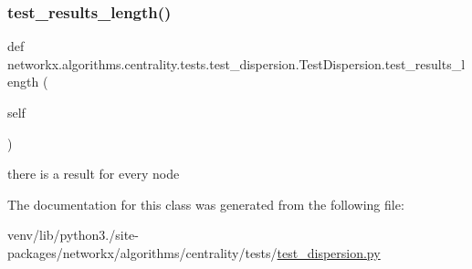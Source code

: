 \subsubsection{\texorpdfstring{test\+\_\+results\+\_\+length()}{test\_results\_length()}}
{\footnotesize\ttfamily def networkx.\+algorithms.\+centrality.\+tests.\+test\+\_\+dispersion.\+Test\+Dispersion.\+test\+\_\+results\+\_\+length (\begin{DoxyParamCaption}\item[{}]{self }\end{DoxyParamCaption})}

\begin{DoxyVerb}there is a result for every node\end{DoxyVerb}
 

The documentation for this class was generated from the following file\+:\begin{DoxyCompactItemize}
\item 
venv/lib/python3./site-\/packages/networkx/algorithms/centrality/tests/\hyperlink{test__dispersion_8py}{test\+\_\+dispersion.\+py}\end{DoxyCompactItemize}
